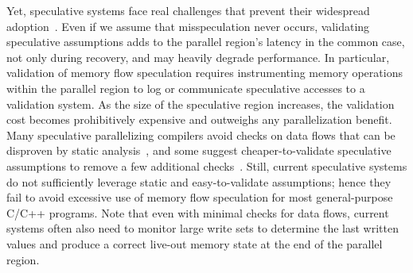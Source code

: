 Yet, speculative systems face real challenges that prevent their widespread
adoption~\cite{cascaval:08:stmtoy:short, .., ..}.
Even if we assume that misspeculation never occurs, validating speculative
assumptions adds to the parallel region's latency in the common case, not only
during recovery, and may heavily degrade performance.
%
In particular, validation of memory flow speculation requires instrumenting
memory operations within the parallel region to log or communicate speculative
accesses to a validation system. As the size of the speculative region
increases, the validation cost becomes prohibitively expensive and outweighs any
parallelization benefit.
%
Many speculative parallelizing compilers avoid checks on data flows that can be
disproven by static analysis~\cite{stmlite, LRPD,..}, and some suggest
cheaper-to-validate speculative assumptions to remove a few additional
checks~\cite{privateer, ..}.
%
Still, current speculative systems do not sufficiently leverage static and
easy-to-validate assumptions; hence they fail to avoid excessive use of memory
flow speculation for most general-purpose C/C++ programs.
%
Note that even with minimal checks for data flows, current systems often also
need to monitor large write sets to determine the last written values and
produce a correct live-out memory state at the end of the parallel region.

%
%

